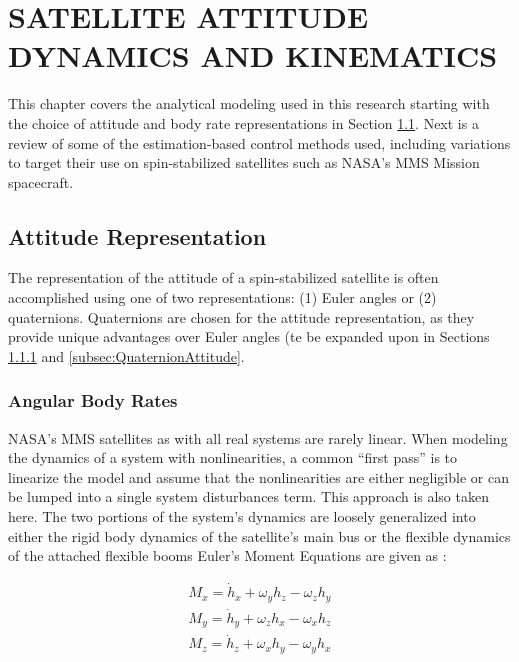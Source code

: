 
\chapter{SATELLITE ATTITUDE DYNAMICS AND KINEMATICS}
\label{chap:SatelliteAttitudeDynamicsAndKinematics}

This chapter covers the analytical modeling used in this research starting with the choice of attitude and body rate representations in Section \ref{sec:StateRepresentation}.  Next is a review of some of the estimation-based control methods used, including variations to target their use on spin-stabilized satellites such as NASA's MMS Mission spacecraft.

\section{Attitude Representation}
\label{sec:StateRepresentation}

The representation of the attitude of a spin-stabilized satellite is often accomplished using one of two representations: (1) Euler angles or (2) quaternions.  Quaternions are chosen for the attitude representation, as they provide unique advantages over Euler angles (te be expanded upon in Sections \ref{subsec:BodyRate} and \ref{subsec:QuaternionAttitude}.

\subsection{Angular Body Rates}
\label{subsec:BodyRate}

NASA's MMS satellites as with all real systems are rarely linear.  When modeling the dynamics of a system with nonlinearities, a common ``first pass'' is to linearize the model and assume that the nonlinearities are either negligible or can be lumped into a single system disturbances term.  This approach is also taken here.  The two portions of the system's dynamics are loosely generalized into either the rigid body dynamics of the satellite's main bus or the flexible dynamics of the attached flexible booms  Euler's Moment Equations are given as \cite{kaplan}:

\begin{subequations}
  \begin{align}
    M_x = \dot{h}_x + \omega_y h_z - \omega_z h_y \\
    M_y = \dot{h}_y + \omega_z h_x - \omega_x h_z \\
    M_z = \dot{h}_z + \omega_x h_y - \omega_y h_x
  \end{align}
  \label{eqn:EulerMoment}
\end{subequations}

